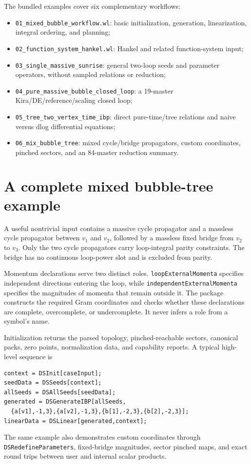 ﻿\documentclass[a4paper,11pt]{article}
\begin{document}
The bundled examples cover six complementary workflows:
\begin{itemize}
  \item \texttt{01\_mixed\_bubble\_workflow.wl}: basic initialization, generation,
  linearization, integral ordering, and planning;
  \item \texttt{02\_function\_system\_hankel.wl}: Hankel and related function-system input;
  \item \texttt{03\_single\_massive\_sunrise}: general two-loop seeds and parameter operators,
  without sampled relations or reduction;
  \item \texttt{04\_pure\_massive\_bubble\_closed\_loop}: a 19-master Kira/DE/reference/scaling
  closed loop;
  \item \texttt{05\_tree\_two\_vertex\_time\_ibp}: direct pure-time/tree relations and
  naive versus dlog differential equations;
  \item \texttt{06\_mix\_bubble\_tree}: mixed cycle/bridge propagators, custom coordinates,
  pinched sectors, and an 84-master reduction summary.
\end{itemize}

\section{A complete mixed bubble-tree example}

A useful nontrivial input contains a massive cycle propagator and a massless cycle
propagator between $v_1$ and $v_2$, followed by a massless fixed bridge from $v_2$ to $v_3$.
Only the two cycle propagators carry loop-integral parity constraints. The bridge has no
continuous loop-power slot and is excluded from parity.

Momentum declarations serve two distinct roles. \texttt{loopExternalMomenta} specifies
independent directions entering the loop, while \texttt{independentExternalMomenta}
specifies the magnitudes of momenta that remain outside it. The package constructs the
required Gram coordinates and checks whether these declarations are complete, overcomplete,
or undercomplete. It never infers a role from a symbol's name.

Initialization returns the parsed topology, pinched-reachable sectors, canonical packs,
zero points, normalization data, and capability reports. A typical high-level sequence is
\begin{verbatim}
context = DSInit[caseInput];
seedData = DSSeeds[context];
allSeeds = DSAllSeeds[seedData];
generated = DSGenerateIBP[allSeeds,
  {a[v1],-1,3},{a[v2],-1,3},{b[1],-2,3},{b[2],-2,3}];
linearData = DSLinear[generated,context];
\end{verbatim}
The same example also demonstrates custom coordinates through
\texttt{DSRedefineParameters}, fixed-bridge magnitudes, sector pinched maps, and exact
round trips between user and internal scalar products.
\end{document}
